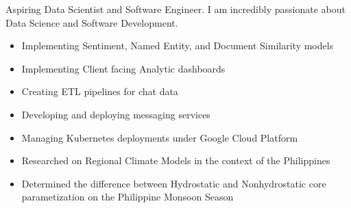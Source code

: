 \documentclass[10pt,a4paper]{altacv}
\begin{document}

\begin{fullwidth}
\makecvheader
\end{fullwidth}


Aspiring Data Scientist and Software Engineer. I am incredibly passionate about Data Science and Software Development.


\begin{itemize}
\item Implementing Sentiment, Named Entity, and Document Similarity models
\item Implementing Client facing Analytic dashboards
\item Creating ETL pipelines for chat data
\item Developing and deploying messaging services
\item Managing Kubernetes deployments under Google Cloud Platform
\end{itemize}

\divider

\begin{itemize}
\item Researched on Regional Climate Models in the context of the Philippines
\item Determined the difference between Hydrostatic and Nonhydrostatic core parametization on the Philippine Monsoon Season
\end{itemize}
\end{document}
